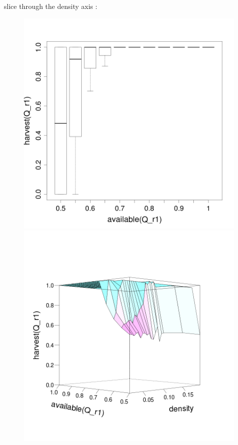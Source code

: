 \documentclass[8pt, handout=show,notes=show]{beamer}
\begin{document}
\begin{frame}{ slice through the density axis : }
\begin{figure}[H]
\includegraphics[width=\imgSize]{images/harvestr1_r1_density-60.png}
\includegraphics[width=\imgSize]{images/R1_median}

\end{figure}
\end{frame}
\end{document}
